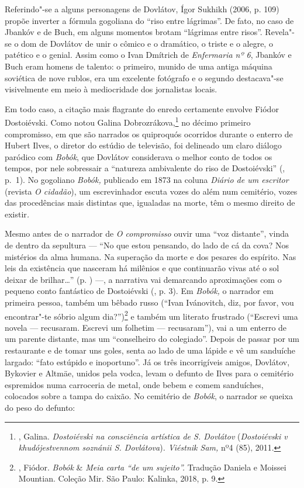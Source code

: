Referindo"-se a alguns personagens de Dovlátov, Ígor Sukhikh (2006, p.
109) propõe inverter a fórmula gogoliana do ``riso entre lágrimas''. De
fato, no caso de Jbankóv e de Buch, em alguns momentos brotam ``lágrimas
entre risos''. Revela"-se o dom de Dovlátov de unir o cômico e o
dramático, o triste e o alegre, o patético e o genial. Assim como o Ivan Dmítrich
de \emph{Enfermaria nº 6}, Jbankóv e Buch eram homens de talento:
o primeiro, munido de uma antiga máquina soviética de nove rublos, era um
excelente fotógrafo e o segundo destacava"-se visivelmente em meio à
mediocridade dos jornalistas locais.

Em todo caso, a citação mais flagrante do enredo certamente envolve
Fiódor Dostoiévski. Como notou Galina Dobrozrákova,\footnote{,
  Galina. \emph{Dostoiévski na consciência artística de S. Dovlátov}
  (\emph{Dostoiévski v khudójestvennom soznánii S. Dovlátova})\emph{.
  Viéstnik Sam,} nº4 (85), 2011.} no décimo primeiro
compromisso, em que são narrados os quiproquós ocorridos durante o
enterro de Hubert Ilves, o diretor do estúdio de televisão, foi
delineado um claro diálogo paródico com \emph{Bobók}, que Dovlátov
considerava o melhor conto de todos os tempos, por nele sobressair a
``natureza ambivalente do riso de Dostoiévski'' (, p.~1). No
gogoliano \emph{Bobók,} publicado em 1873 na coluna \emph{Diário de um
escritor} (revista \emph{O cidadão}), um escrevinhador escuta
vozes do além num cemitério, vozes das procedências mais distintas que,
igualadas na morte, têm o mesmo direito de existir\emph{. }

Mesmo antes de o narrador de \emph{O compromisso} ouvir uma ``voz
distante'', vinda de dentro da sepultura --- ``No que estou pensando, do
lado de cá da cova? Nos mistérios da alma humana. Na superação da morte
e dos pesares do espírito. Nas leis da existência que nasceram há
milênios e que continuarão vivas até o sol deixar de brilhar\ldots{}'' (p. \pageref{ref6})
---, a narrativa vai demarcando aproximações com o pequeno conto
fantástico de Dostoiévski (, p. 3). Em \emph{Bobók,} o
narrador em primeira pessoa, também um bêbado russo (``Ivan Ivánovitch,
diz, por favor, vou encontrar"-te sóbrio algum dia?'')\footnote{,
  Fiódor. \emph{Bobók} \& \emph{Meia carta ``de um sujeito''.} Tradução
  Daniela e Moissei Mountian. Coleção Mir. São Paulo: Kalinka, 2018, p.
  9.} e também um literato frustrado (``Escrevi uma novela ---
recusaram. Escrevi um folhetim --- recusaram''), vai a um enterro de um
parente distante, mas um ``conselheiro do colegiado''. Depois de passar
por um restaurante e de tomar uns goles, senta ao lado de uma lápide e
vê um sanduíche largado: ``fato estúpido e inoportuno''. Já os três
incorrigíveis amigos, Dovlátov, Bykovier e Altmäe, unidos pela vodca,
levam o defunto de Ilves para o cemitério espremidos numa carroceria de
metal, onde bebem e comem sanduíches, colocados sobre a tampa do caixão.
No cemitério de \emph{Bobók}, o narrador se queixa do peso do defunto:

